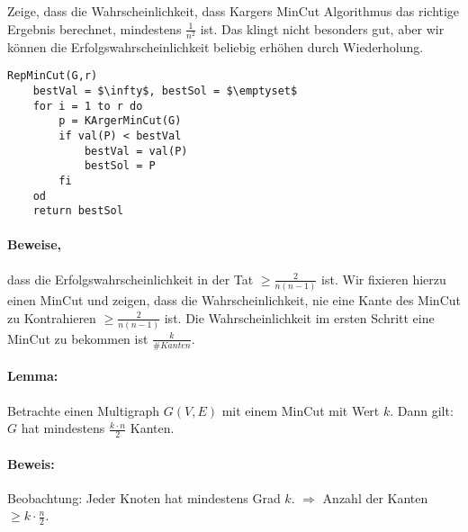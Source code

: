 Zeige, dass die Wahrscheinlichkeit, dass Kargers MinCut Algorithmus das richtige Ergebnis berechnet, mindestens $\frac{1}{n^2}$ ist. Das klingt nicht besonders gut, aber wir können die Erfolgswahrscheinlichkeit beliebig erhöhen durch Wiederholung.

\begin{lstlisting}[mathescape]
RepMinCut(G,r)
	bestVal = $\infty$, bestSol = $\emptyset$
	for i = 1 to r do
		p = KArgerMinCut(G)
		if val(P) < bestVal
			bestVal = val(P)
			bestSol = P
		fi
	od
	return bestSol
\end{lstlisting}



\paragraph*{Beweise,} dass die Erfolgswahrscheinlichkeit in der Tat $\geq \frac{2}{n(n-1)}$ ist. Wir fixieren hierzu einen MinCut und zeigen, dass die Wahrscheinlichkeit, nie eine Kante des MinCut zu Kontrahieren $\geq \frac{2}{n(n-1)}$ ist.
Die Wahrscheinlichkeit im ersten Schritt eine MinCut zu bekommen ist $\frac{k}{\#Kanten}$.

\paragraph*{Lemma:} Betrachte einen Multigraph $G(V,E)$ mit einem MinCut mit Wert $k$. Dann gilt: $G$ hat mindestens $\frac{k \cdot n}{2}$ Kanten.
\paragraph*{Beweis:} Beobachtung: Jeder Knoten hat mindestens Grad $k$. $\Rightarrow$ Anzahl der Kanten $\geq k \cdot \frac{n}{2}$.


